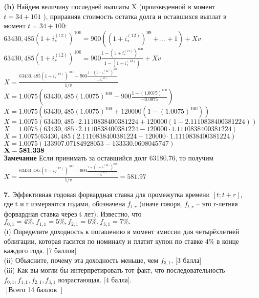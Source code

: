 \documentclass{article}
\begin{document}
 {\bf (b)} Найдем величину последней выплаты X (произведенной в момент $t=34+101$ ), приравняв стоимость остатка долга и оставшихся выплат в момент $t=34+100:$\\
 
 $63430,485(1+i_{*}^{(12)})^{100} = 900(  (1+i_{*}^{(12)})^{99} + \dots + 1) + Xv $\\
 
 $ 63430,485(1+i_{*}^{(12)})^{100} = 900\frac{ 1 -  (1+i_{*}^{(12)})^{100}}{  1 - (1+i_{*}^{(12)} ) }  + Xv$\\
 
 $X= \frac{ 63430,485(1+i_{*}^{(12)})^{100}  -  900\frac{ 1 -  (1+i_{*}^{(12)})^{100}}{  - i_{*}^{(12)}  }  }{1/v}$\\
 
  $X= 1.0075(63430,485(1.0075)^{100}  -  900\frac{ 1 -  (1.0075)^{100}}{  - 0.0075  } ) $\\
  
  $X= 1.0075(63430,485(1.0075)^{100}  +  120000 ( 1 -  (1.0075)^{100} ) )$\\

$X= 1.0075(63430,485 \cdot 2.1110838400381224 +  120000 ( 1 -  2.1110838400381224 ) )$\\

$X= 1.0075(63430,485 \cdot 2.1110838400381224 -  120000  \cdot   1.1110838400381224)$\\

$X= 1.0075(63430,485(2.1110838400381224 -  120000  \cdot   1.1110838400381224)$\\

$X= 1.0075( 133907.07184928053 -133330.0608045747)$\\

$ \bf X = 581.338$\\

{\bf Замечание}
Если принимать за оставшийся долг  63180.76, то получим\\
 $X= \frac{ 63430,485(1+i_{*}^{(12)})^{100}  -  900\frac{ 1 -  (1+i_{*}^{(12)})^{100}}{  - i_{*}^{(12)}  }  }{1/v} = 581.97$


{\bf \large 7.} Эффективная годовая форвардная ставка для промежутка времени $\left[ t; t+r\right]$, где   t и r   измеряются годами, обозначена  $f_{t,r}$
  (иначе говоря,  $f_{t,r}$  – это  r-летняя форвардная ставка через t лет). Известно, что  $f_{0,1}=4\%,   f_{1,1}=5\%, f_{2,1}=6\%, f_{3,1}=7\%.$\\
(i) Определите доходность к погашению в момент эмиссии для четырёхлетней облигации, которая  гасится по номиналу и платит купон по ставке $4\%$ в конце каждого года.  [7 баллов]\\
(ii) Объясните, почему эта доходность меньше, чем $f_{3,1}.$   [3 балла]\\
(iii) Как вы могли бы интерпретировать тот факт, что последовательность   $f_{0,1}, f_{1,1}, f_{2,1}, f_{3,1}$  возрастающая. [4 балла].\\
$\left[\right. $Всего 14 баллов $\left.\right]$\\
\end{document}
